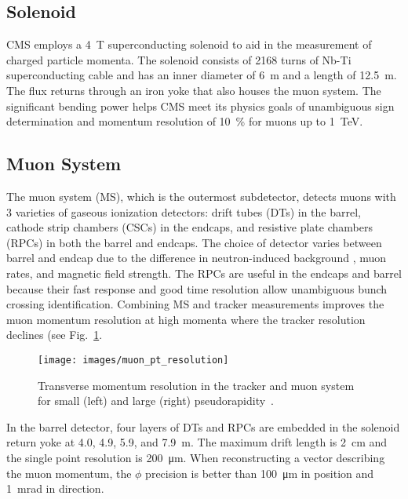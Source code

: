 \documentclass[12pt]{article}
\begin{document}
    \subsection{Solenoid}
        CMS employs a \SI{4}{T} superconducting solenoid to aid in the measurement of charged particle momenta. The solenoid consists of \num{2168} turns of Nb-Ti superconducting cable and has an inner diameter of \SI{6}{m} and a length of \SI{12.5}{m}. The flux returns through an iron yoke that also houses the muon system. The significant  bending power helps CMS meet its physics goals of unambiguous sign determination and momentum resolution of \SI{10}{\percent} for muons up to \SI{1}{\tera\electronvolt}\cite{cms_experiment}.

    \subsection{Muon System}
        The muon system (MS), which is the outermost subdetector, detects muons with \num{3} varieties of gaseous ionization detectors: drift tubes (DTs) in the barrel, cathode strip chambers (CSCs) in the endcaps, and resistive plate chambers (RPCs) in both the barrel and endcaps. The choice of detector varies between barrel and endcap due to the difference in neutron-induced background , muon rates, and magnetic field strength. The RPCs are useful in the endcaps and barrel because their fast response and good time resolution allow unambiguous bunch crossing identification. Combining MS and tracker measurements improves the muon momentum resolution at high momenta where the tracker resolution declines (see Fig.~\ref{muon_pt_resolution}\cite{cms_experiment, cms_tdr}.

        \noindent \begin{figure}[htbp] \begin{center}
        \texttt{[image: images/muon\_pt\_resolution]}
            \caption{Transverse momentum resolution in the tracker and muon system for small (left) and large (right) pseudorapidity~\cite{cms_image}.}
        \label{muon_pt_resolution}
        \end{center} \end{figure}

        In the barrel detector, four layers of DTs and RPCs are embedded in the solenoid return yoke at \num{4.0}, \num{4.9}, \num{5.9}, and \SI{7.9}{m}. The maximum drift length is \SI{2}{\centi\m} and the single point resolution is \SI{200}{\micro\m}. When reconstructing a vector describing the muon momentum, the $\phi$ precision is better than \SI{100}{\micro\m} in position and \SI{1}{\milli\radian} in direction. 
\end{document}
